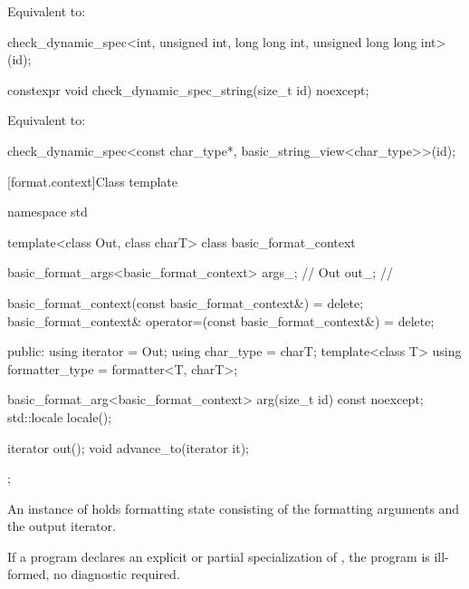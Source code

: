 \begin{itemdescr}
\pnum
\effects
Equivalent to:
\begin{codeblock}
check_dynamic_spec<int, unsigned int, long long int, unsigned long long int>(id);
\end{codeblock}
\end{itemdescr}

%
\begin{itemdecl}
constexpr void check_dynamic_spec_string(size_t id) noexcept;
\end{itemdecl}

\begin{itemdescr}
\pnum
\effects
Equivalent to:
\begin{codeblock}
check_dynamic_spec<const char_type*, basic_string_view<char_type>>(id);
\end{codeblock}
\end{itemdescr}

[format.context]{Class template }

%
%
%
%
\begin{codeblock}
namespace std {
  template<class Out, class charT>
  class basic_format_context {
    basic_format_args<basic_format_context> args_;      // \expos
    Out out_;                                           // \expos

    basic_format_context(const basic_format_context&) = delete;
    basic_format_context& operator=(const basic_format_context&) = delete;

  public:
    using iterator = Out;
    using char_type = charT;
    template<class T> using formatter_type = formatter<T, charT>;

    basic_format_arg<basic_format_context> arg(size_t id) const noexcept;
    std::locale locale();

    iterator out();
    void advance_to(iterator it);
  };
}
\end{codeblock}

\pnum
An instance of  holds formatting state
consisting of the formatting arguments and the output iterator.

\pnum
If a program declares an explicit or partial specialization of
,
the program is ill-formed, no diagnostic required.

